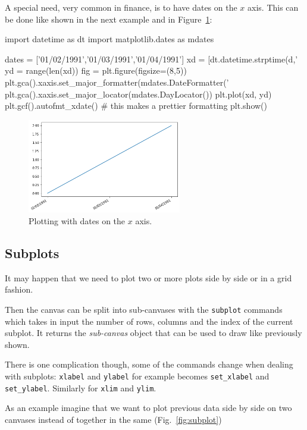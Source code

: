 A special need, very common in finance, is to have dates on the $x$ axis. This can be done like shown in the next example and in Figure~\ref{fig:axis3}:

\begin{ipython}
import datetime as dt
import matplotlib.dates as mdates

dates = ['01/02/1991','01/03/1991','01/04/1991']
xd = [dt.datetime.strptime(d,'%
yd = range(len(xd))
fig = plt.figure(figsize=(8,5))
plt.gca().xaxis.set_major_formatter(mdates.DateFormatter('%
plt.gca().xaxis.set_major_locator(mdates.DayLocator())
plt.plot(xd, yd)
plt.gcf().autofmt_xdate() # this makes a prettier formatting
plt.show()
\end{ipython}

\begin{figure}[ht]
	\centering
	\includegraphics[width=0.6\textwidth]{figures/axis3}
	\caption{Plotting with dates on the $x$ axis.}
	\label{fig:axis3}
\end{figure}

\subsection{Subplots}
\label{subplots}

It may happen that we need to plot two or more plots side by side or in a grid fashion.

Then the canvas can be split into sub-canvases with the  \texttt{subplot} commands which takes in input the number of rows, columns and the index of the current subplot. It returns the \emph{sub-canvas} object that can be used to draw like previously shown.

There is one complication though, some of the commands change when
dealing with subplots: \texttt{xlabel} and \texttt{ylabel} for example becomes \texttt{set\_xlabel} and \texttt{set\_ylabel}. Similarly for \texttt{xlim} and \texttt{ylim}.

As an example imagine that we want to plot previous data side by side on two canvases instead of together in the same (Fig.~\ref{fig:subplot})


